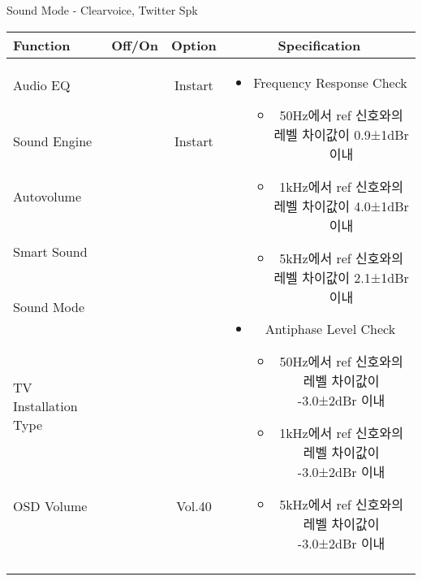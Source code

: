 \begin{frame}[t]{Sound Mode - Clearvoice, Twitter Spk}
\begin{tiny}
\begin{tabular}{@{}lccc@{}}
\toprule
Function & Off/On & Option & Specification \\
\midrule
Audio EQ & \color{black}{Off} & Instart &
\multirow{10}{60mm}{
\begin{itemize}
	\item Frequency Response Check
	\begin{itemize}
		\item 50Hz에서 ref 신호와의 레벨 차이값이 0.9±1dBr 이내
		\item 1kHz에서 ref 신호와의 레벨 차이값이 4.0±1dBr 이내
		\item 5kHz에서 ref 신호와의 레벨 차이값이 2.1±1dBr 이내	
	\end{itemize}
	\item Antiphase Level Check
	\begin{itemize}
		\item 50Hz에서 ref 신호와의 레벨 차이값이 -3.0±2dBr 이내
		\item 1kHz에서 ref 신호와의 레벨 차이값이 -3.0±2dBr 이내
		\item 5kHz에서 ref 신호와의 레벨 차이값이 -3.0±2dBr 이내
	\end{itemize}	
\end{itemize}
} \\
Sound Engine & \color{blue}{On} & Instart & \\
Autovolume & \color{black}{Off} & & \\
Smart Sound & \color{black}{Off} & & \\
Sound Mode & \color{blue}{On} & \color{blue}{Clearvoice} & \\
TV Installation Type & \color{blue}{On} & \color{black}{Standtype1} & \\
OSD Volume & \color{blue}{On} & Vol.40 & \\
& & & \\
& & & \\
& & & \\
& & & \\\midrule
\end{tabular}
\end{tiny}


\end{frame}
